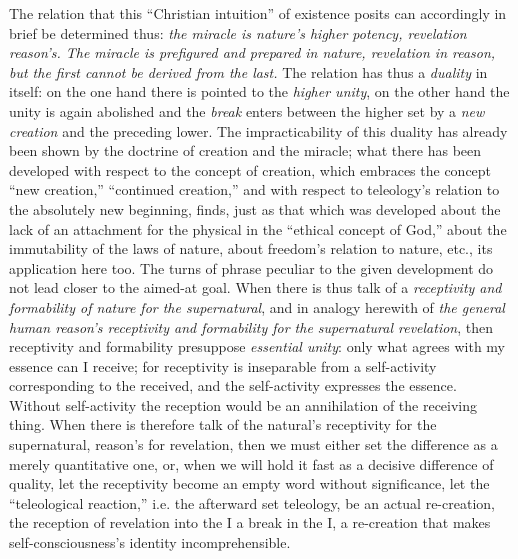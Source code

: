 \documentclass[12pt,a4paper]{book}
\begin{document}
The relation that this ``Christian intuition'' of existence posits can accordingly in
brief be determined thus: \emph{the miracle is nature's higher potency, revelation
reason's. The miracle is prefigured and prepared in nature, revelation in reason, but the
first cannot be derived from the last.} The relation has thus a \emph{duality} in itself:
on the one hand there is pointed to the \emph{higher unity}, on the other hand the unity is
again abolished and the \emph{break} enters between the higher set by a \emph{new creation} and the
preceding lower. The impracticability of this duality has already been shown by the
doctrine of creation and the miracle; what there has been developed with respect to the
concept of creation, which embraces the concept ``new creation,'' ``continued creation,''
and with respect to teleology's relation to the absolutely new beginning, finds, just as
that which was developed about the lack of an attachment for the physical in the ``ethical
concept of God,'' about the immutability of the laws of nature, about freedom's relation to
nature, etc., its application here too. The turns of phrase peculiar to the given
development do not lead closer to the aimed-at goal. When there is thus talk of a
\emph{receptivity and formability of nature for the supernatural}, and in analogy herewith
of \emph{the general human reason's receptivity and formability for the supernatural
revelation}, then receptivity and formability presuppose \emph{essential unity}: only what
agrees with my essence can I receive; for receptivity is inseparable from a self-activity
corresponding to the received, and the self-activity expresses the essence. Without
self-activity the reception would be an annihilation of the receiving thing. When there is
therefore talk of the natural's receptivity for the supernatural, reason's for revelation,
then we must either set the difference as a merely quantitative one, or, when we will hold
it fast as a decisive difference of quality, let the receptivity become an empty word
without significance, let the ``teleological reaction,'' i.e. the afterward set teleology,
be an actual re-creation, the reception of revelation into the I a break in the I, a
re-creation that makes self-consciousness's identity incomprehensible.
\end{document}
